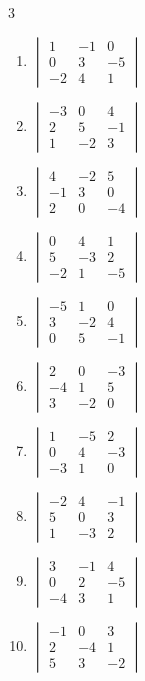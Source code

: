 \begin{multicols}{3}
\begin{enumerate}[label=\arabic*.,  leftmargin=*]
\item $\begin{vmatrix} 1 & -1 & 0 \\ 0 & 3 & -5 \\ -2 & 4 & 1 \end{vmatrix}$
\item $\begin{vmatrix} -3 & 0 & 4 \\ 2 & 5 & -1 \\ 1 & -2 & 3 \end{vmatrix}$
\item $\begin{vmatrix} 4 & -2 & 5 \\ -1 & 3 & 0 \\ 2 & 0 & -4 \end{vmatrix}$
\item $\begin{vmatrix} 0 & 4 & 1 \\ 5 & -3 & 2 \\ -2 & 1 & -5 \end{vmatrix}$
\item $\begin{vmatrix} -5 & 1 & 0 \\ 3 & -2 & 4 \\ 0 & 5 & -1 \end{vmatrix}$
\item $\begin{vmatrix} 2 & 0 & -3 \\ -4 & 1 & 5 \\ 3 & -2 & 0 \end{vmatrix}$
\item $\begin{vmatrix} 1 & -5 & 2 \\ 0 & 4 & -3 \\ -3 & 1 & 0 \end{vmatrix}$
\item $\begin{vmatrix} -2 & 4 & -1 \\ 5 & 0 & 3 \\ 1 & -3 & 2 \end{vmatrix}$
\item $\begin{vmatrix} 3 & -1 & 4 \\ 0 & 2 & -5 \\ -4 & 3 & 1 \end{vmatrix}$
\item $\begin{vmatrix} -1 & 0 & 3 \\ 2 & -4 & 1 \\ 5 & 3 & -2 \end{vmatrix}$

\end{enumerate}
\end{multicols}
